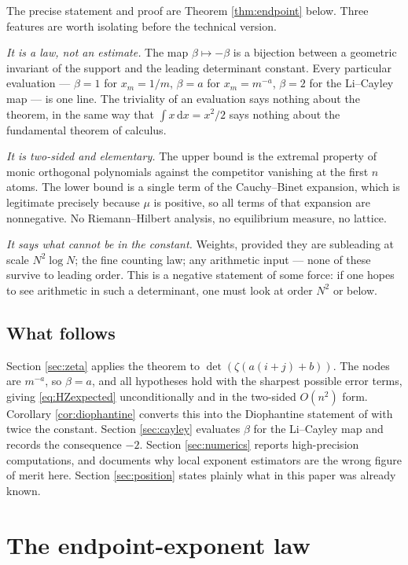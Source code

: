 \documentclass[11pt]{amsart}
\numberwithin{equation}{section}
\theoremstyle{plain}
\theoremstyle{definition}
\theoremstyle{remark}
\newcommand{\dd}{\,\mathrm d}
\begin{document}
The precise statement and proof are Theorem \ref{thm:endpoint} below. Three features are worth
isolating before the technical version.

\emph{It is a law, not an estimate.} The map $\beta\mapsto-\beta$ is a bijection between a geometric
invariant of the support and the leading determinant constant. Every particular evaluation
--- $\beta=1$ for $x_{m}=1/m$, $\beta=a$ for $x_{m}=m^{-a}$, $\beta=2$ for the Li--Cayley map --- is one
line. The triviality of an evaluation says nothing about the theorem, in the same way that
$\int x\dd x=x^{2}/2$ says nothing about the fundamental theorem of calculus.

\emph{It is two-sided and elementary.} The upper bound is the extremal property of monic orthogonal
polynomials against the competitor vanishing at the first $n$ atoms. The lower bound is a single
term of the Cauchy--Binet expansion, which is legitimate precisely because $\mu$ is positive, so all
terms of that expansion are nonnegative. No Riemann--Hilbert analysis, no equilibrium measure, no
lattice.

\emph{It says what cannot be in the constant.} Weights, provided they are subleading at scale
$N^{2}\log N$; the fine counting law; any arithmetic input --- none of these survive to leading order.
This is a negative statement of some force: if one hopes to see arithmetic in such a determinant,
one must look at order $N^{2}$ or below.

\subsection{What follows}

Section \ref{sec:zeta} applies the theorem to $\det(\zeta(a(i+j)+b))$. The nodes are $m^{-a}$, so
$\beta=a$, and all hypotheses hold with the sharpest possible error terms, giving
\eqref{eq:HZexpected} unconditionally and in the two-sided $O(n^{2})$ form. Corollary
\ref{cor:diophantine} converts this into the Diophantine statement of \cite{HaynesZudilin2015}
with twice the constant. Section \ref{sec:cayley} evaluates $\beta$ for the Li--Cayley map and
records the consequence $-2$. Section \ref{sec:numerics} reports high-precision computations, and
documents why local exponent estimators are the wrong figure of merit here. Section
\ref{sec:position} states plainly what in this paper was already known.

\section{The endpoint-exponent law}
\label{sec:law}
\end{document}
